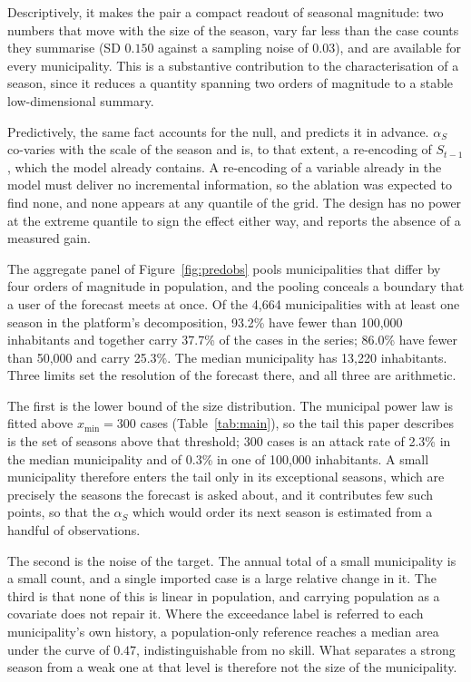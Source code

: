 \documentclass[english,10pt,b5paper]{article}
\begin{document}
Descriptively, it makes the pair a compact readout of seasonal magnitude: two
numbers that move with the size of the season, vary far less than the case counts
they summarise (SD $0.150$ against a sampling noise of $0.03$), and are available
for every municipality. This is a substantive contribution to the characterisation
of a season, since it reduces a quantity spanning two orders of magnitude to a
stable low-dimensional summary.

Predictively, the same fact accounts for the null, and predicts it in advance.
$\alpha_S$ co-varies with the scale of the season and is, to that extent, a
re-encoding of $S_{t-1}$, which the model already contains. A re-encoding of a
variable already in the model must deliver no incremental information, so the
ablation was expected to find none, and none appears at any quantile of the grid.
The design has no power at the extreme quantile to sign the effect either way, and
reports the absence of a measured gain.

The aggregate panel of Figure~\ref{fig:predobs} pools municipalities that
differ by four orders of magnitude in population, and the pooling conceals a
boundary that a user of the forecast meets at once. Of the 4{,}664
municipalities with at least one season in the platform's decomposition,
93.2\% have fewer than 100{,}000 inhabitants and together carry 37.7\% of the
cases in the series; 86.0\% have fewer than 50{,}000 and carry 25.3\%. The
median municipality has 13{,}220 inhabitants. Three limits set the resolution
of the forecast there, and all three are arithmetic.

The first is the lower bound of the size distribution. The municipal power law
is fitted above $x_{\min}=300$ cases (Table~\ref{tab:main}), so the tail this
paper describes is the set of seasons above that threshold; 300 cases is an
attack rate of 2.3\% in the median municipality and of 0.3\% in one of
100{,}000 inhabitants. A small municipality therefore enters the tail only in
its exceptional seasons, which are precisely the seasons the forecast is asked
about, and it contributes few such points, so that the $\alpha_S$ which would
order its next season is estimated from a handful of observations.

The second is the noise of the target. The annual total of a small
municipality is a small count, and a single imported case is a large relative
change in it. The third is that none of this is linear in population, and
carrying population as a covariate does not repair it. Where the exceedance
label is referred to each municipality's own history, a population-only
reference reaches a median area under the curve of $0.47$, indistinguishable
from no skill. What separates a strong season from a weak one at that level is
therefore not the size of the municipality.
\end{document}
